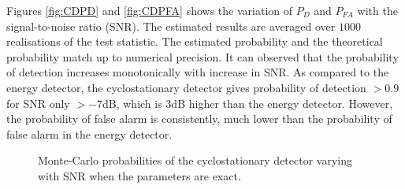 \documentclass[11pt]{article}
\begin{document}
Figures \ref{fig:CDPD} and \ref{fig:CDPFA} shows the variation of $P_{D}$ and $P_{FA}$ with the signal-to-noise ratio (SNR). The estimated results are averaged over $1000$ realisations of the test statistic. The estimated probability and the theoretical probability match up to numerical precision. It can observed that the probability of detection increases monotonically with increase in SNR. As compared to the energy detector, the cyclostationary detector gives probability of detection $>0.9$ for SNR only $>-7$dB, which is $3$dB higher than the energy detector. However, the probability of false alarm is consistently, much lower than the probability of false alarm in the energy detector.
\begin{figure}[h]
\centering
{}
\caption{Monte-Carlo probabilities of the cyclostationary detector varying with SNR when the parameters are exact.}
\label{fig:CD_exact}
\end{figure}

\noindent {}
\end{document}
